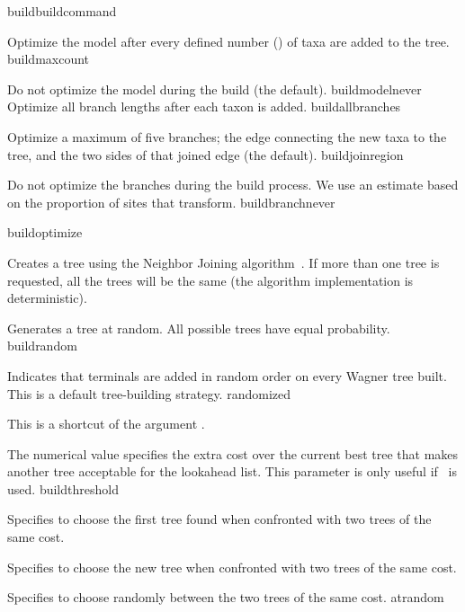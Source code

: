 \begin{command}{build}{buildcommand}
\begin{arguments}
{\begin{description}
{Optimize the model after every defined number (\poyint) of taxa
are added to the tree.} 
{buildmaxcount}

{Do not optimize the model during the build (the default).}
{buildmodelnever}
\\
{Optimize all branch lengths after each taxon is added.}
{buildallbranches}

{Optimize a maximum of five branches; the edge connecting
the new taxa to the tree, and the two sides of that joined
edge (the default).}
{buildjoinregion}

{Do not optimize the branches during the build process. We use
an estimate based on the proportion of sites that transform.}
{buildbranchnever}

\end{description}
}
{buildoptimize}

{Creates a tree using the Neighbor Joining algorithm~\cite{saitou1987}.
If more than one tree is requested, all the trees will be the same
(the algorithm implementation is deterministic).}{}

{Generates a tree at random. All possible trees have equal probability.}
{buildrandom}

{Indicates that terminals are added in random order on every Wagner
tree built. This is a default tree-building strategy.} 
{randomized}

{This is a shortcut of the argument .}
{}

{The numerical value specifies the extra cost over the current best
tree that makes another tree acceptable for the lookahead list. This 
parameter is only useful if~ is used.}
{buildthreshold}

{Specifies to choose the first tree found when confronted with two trees of the same cost.}
{}

{Specifies to choose the new tree when confronted with two trees of the same cost.}
{}

{Specifies to choose randomly between the two trees of the same cost.}
{atrandom}


\end{arguments}
\end{command}
